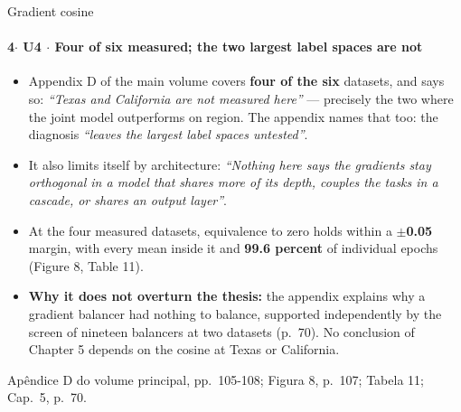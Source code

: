 \documentclass{beamer}
\begin{document}
\begin{frame}[noframenumbering]{Gradient cosine}
    \framesubtitle{\normalsize 4$\cdot$ \textbf{U4} $\cdot$ Four of six measured; the two largest label spaces are not}
    \hypertarget{u4}{}
    \small
    \begin{itemize}\setlength{\itemsep}{0pt}\setlength{\parskip}{0pt}
        \item Appendix D of the main volume covers \textbf{four of the six} datasets, and says so: \textit{``Texas and California are not measured here''} --- precisely the two where the joint model outperforms on region. The appendix names that too: the diagnosis \textit{``leaves the largest label spaces untested''}.
        \item It also limits itself by architecture: \textit{``Nothing here says the gradients stay orthogonal in a model that shares more of its depth, couples the tasks in a cascade, or shares an output layer''}.
        \item At the four measured datasets, equivalence to zero holds within a \textbf{$\pm$0.05} margin, with every mean inside it and \textbf{99.6 percent} of individual epochs (Figure 8, Table 11).
        \item \textbf{Why it does not overturn the thesis:} the appendix explains why a gradient balancer had nothing to balance, supported independently by the screen of nineteen balancers at two datasets (p.~70). No conclusion of Chapter 5 depends on the cosine at Texas or California.
    \end{itemize}
    \vfill
    {\scriptsize
    \begin{minipage}[b]{0.775\linewidth}\raggedright\textcolor{black!70}{Apêndice D do volume principal, pp.~105-108; Figura 8, p.~107; Tabela 11; Cap.~5, p.~70.}\end{minipage}\hfill
    \begin{minipage}[b]{0.20\linewidth}\raggedleft \hyperlink{b0}{}\end{minipage}}
\end{frame}
\end{document}
